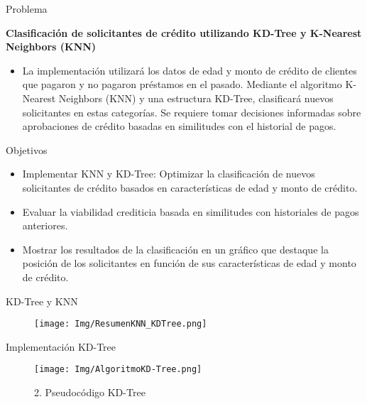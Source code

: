\documentclass [xcolor=svgnames, t] {beamer}
\begin{document}
\begin{frame}{Problema}
\begin{center}
\textbf{Clasificación de solicitantes de crédito utilizando KD-Tree y K-Nearest Neighbors (KNN)}\\
\vspace{0.8cm}
\begin{itemize}
\item  La implementación utilizará los datos de edad y monto de crédito de clientes que pagaron y no pagaron préstamos en el pasado. Mediante el algoritmo K-Nearest Neighbors (KNN) y una estructura KD-Tree, clasificará nuevos solicitantes en estas categorías. Se requiere tomar decisiones informadas sobre aprobaciones de crédito basadas en similitudes con el historial de pagos.
\end{itemize}
\end{center}
\end{frame}

\begin{frame}{Objetivos}
 \vspace{1cm}   
\begin{itemize}
    \item Implementar KNN y KD-Tree: Optimizar la clasificación de nuevos solicitantes de crédito basados en características de edad y monto de crédito.
    \item Evaluar la viabilidad crediticia basada en similitudes con historiales de pagos anteriores.
    \item Mostrar los resultados de la clasificación en un gráfico que destaque la posición de los solicitantes en función de sus características de edad y monto de crédito.
\end{itemize}
\end{frame}
\begin{frame}
{KD-Tree y KNN\autocite{GeorgeGaryStanley2009Algorithms}}
\begin{figure}
    \centering
    \texttt{[image: Img/ResumenKNN\_KDTree.png]}
\end{figure}
\end{frame}

\begin{frame}{Implementación KD-Tree\autocite{Bishop2006PRML}}
\begin{figure}
    \centering
    \texttt{[image: Img/AlgoritmoKD-Tree.png]}
    \caption{2. Pseudocódigo KD-Tree}
\end{figure}  
\end{frame}
\end{document}
